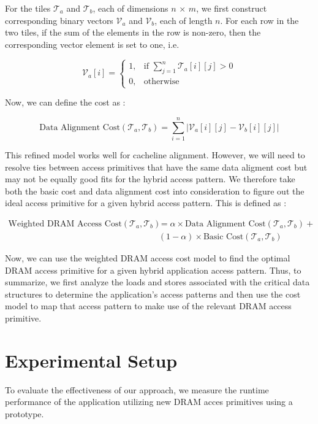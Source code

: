 \documentclass[letterpaper]{article}
\begin{document}
For the tiles $\mathcal{T}_{a}$ and $\mathcal{T}_{b}$, each of dimensions $n$
$\times$ $m$, we first construct corresponding binary vectors $\mathcal{V}_{a}$
and $\mathcal{V}_{b}$, each of length $n$. For each row in the two tiles, 
if the sum of the elements in the row is non-zero, then the corresponding vector
element is set to one, i.e.

\[
\mathcal{V}_{a}[i] =
\begin{cases}
1 , & \text{if } \sum_{j=1}^{n} \mathcal{T}_{a}[i][j] > 0 \\
0 , & \text{otherwise} 
\end{cases}
\]

Now, we can define the cost as :

$$\text{Data Alignment Cost}(\mathcal{T}_{a}, \mathcal{T}_{b}) = \sum_{i=1}^{n} 
| \mathcal{V}_{a}[i][j] - \mathcal{V}_{b}[i][j] |$$

This refined model works well for cacheline alignment. However, we will need to
resolve ties between access primitives that have the same data aligment cost but
may not be equally good fits for the hybrid access pattern.
We therefore take both the basic cost and data alignment cost into consideration
to figure out the ideal access primitive for a given hybrid access pattern.
This is defined as :

\begin{align*}
\text{Weighted DRAM Access Cost}(\mathcal{T}_{a}, \mathcal{T}_{b}) 
&= \alpha \times \text{Data Alignment Cost}(\mathcal{T}_{a}, \mathcal{T}_{b})
+ \\
& (1-\alpha) \times \text{Basic Cost}(\mathcal{T}_{a}, \mathcal{T}_{b})
\end{align*}

Now, we can use the weighted DRAM access cost model to find the optimal DRAM
access primitive for a given hybrid application access pattern. Thus, to summarize,
we first analyze the loads and stores associated with the critical data
structures to determine the application's access patterns and then use the
cost model to map that access pattern to make use of the relevant DRAM access
primitive.

\section{Experimental Setup}

To evaluate the effectiveness of our approach, we measure the runtime performance of the application utilizing new DRAM acces primitives using a prototype.
\end{document}
